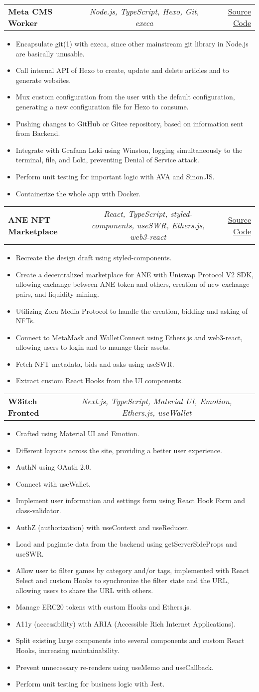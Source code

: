 \documentclass[a4paper,11pt]{article}
\makeatletter
\newcommand{\resumeItem}[1]{
  \item\small{#1}
}
\newcommand{\resumeItemListStart}{\begin{itemize}[rightmargin=0.11in]}
\newcommand{\resumeItemListEnd}{\end{itemize}}
\newcommand{\resumeTrioHeading}[3]{
  \item\small{
    \begin{tabular*}{0.96\textwidth}[t]{
      l@{\extracolsep{\fill}}c@{\extracolsep{\fill}}r
    }
      \textbf{#1} & \textit{#2} & #3
    \end{tabular*}
  }
}
\makeatother
\begin{document}
  \resumeTrioHeading{Meta CMS Worker}{Node.js, TypeScript, Hexo, Git, execa}{\href{https://github.com/Meta-Network/meta-cms-worker}{\uline{Source Code}}}
  \resumeItemListStart{}
    \resumeItem{Encapsulate git(1) with execa, since other mainstream git library in Node.js are basically unusable.}
    \resumeItem{Call internal API of Hexo to create, update and delete articles and to generate websites.}
    \resumeItem{Mux custom configuration from the user with the default configuration, generating a new configuration file for Hexo to consume.}
    \resumeItem{Pushing changes to GitHub or Gitee repository, based on information sent from Backend.}
    \resumeItem{Integrate with Grafana Loki using Winston, logging simultaneously to the terminal, file, and Loki, preventing Denial of Service attack.}
    \resumeItem{Perform unit testing for important logic with AVA and Sinon.JS.}
    \resumeItem{Containerize the whole app with Docker.}
  \resumeItemListEnd{}

  \resumeTrioHeading{ANE NFT Marketplace}{React, TypeScript, styled-components, useSWR, Ethers.js, web3-react}{\href{https://github.com/Artnomics-org/art-and-economics}{\uline{Source Code}}}
  \resumeItemListStart{}
    \resumeItem{Recreate the design draft using styled-components.}
    \resumeItem{Create a decentralized marketplace for ANE with Uniswap Protocol V2 SDK, allowing exchange between ANE token and others, creation of new exchange pairs, and liquidity mining.}
    \resumeItem{Utilizing Zora Media Protocol to handle the creation, bidding and asking of NFTs.}
    \resumeItem{Connect to MetaMask and WalletConnect using Ethers.js and web3-react, allowing users to login and to manage their assets.}
    \resumeItem{Fetch NFT metadata, bids and asks using useSWR.}
    \resumeItem{Extract custom React Hooks from the UI components.}
  \resumeItemListEnd{}

  \resumeTrioHeading{W3itch Fronted}{Next.js, TypeScript, Material UI, Emotion, Ethers.js, useWallet}{}
  \resumeItemListStart{}
    \resumeItem{Crafted using Material UI and Emotion.}
    \resumeItem{Different layouts across the site, providing a better user experience.}
    \resumeItem{AuthN using OAuth 2.0.}
    \resumeItem{Connect with useWallet.}
    \resumeItem{Implement user information and settings form using React Hook Form and class-validator.}
    \resumeItem{AuthZ (authorization) with useContext and useReducer.}
    \resumeItem{Load and paginate data from the backend using getServerSideProps and useSWR.}
    \resumeItem{Allow user to filter games by category and/or tags, implemented with React Select and custom Hooks to synchronize the filter state and the URL, allowing users to share the URL with others.}
    \resumeItem{Manage ERC20 tokens with custom Hooks and Ethers.js.}
    \resumeItem{A11y (accessibility) with ARIA (Accessible Rich Internet Applications).}
    \resumeItem{Split existing large components into several components and custom React Hooks, increasing maintainability.}
    \resumeItem{Prevent unnecessary re-renders using useMemo and useCallback.}
    \resumeItem{Perform unit testing for business logic with Jest.}
  \resumeItemListEnd{}
\end{document}
